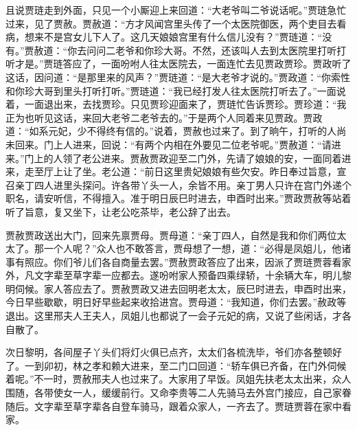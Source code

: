 \begin{parag}
    且说贾琏走到外面，只见一个小厮迎上来回道：“大老爷叫二爷说话呢。”贾琏急忙过来，见了贾赦。贾赦道：“方才风闻宫里头传了一个太医院御医，两个吏目去看病，想来不是宫女儿下人了。这几天娘娘宫里有什么信儿没有？”贾琏道：“没有。”贾赦道：“你去问问二老爷和你珍大哥。不然，还该叫人去到太医院里打听打听才是。”贾琏答应了，一面吩咐人往太医院去，一面连忙去见贾政贾珍。贾政听了这话，因问道：“是那里来的风声？”贾琏道：“是大老爷才说的。”贾政道：“你索性和你珍大哥到里头打听打听。”贾琏道：“我已经打发人往太医院打听去了。”一面说着，一面退出来，去找贾珍。只见贾珍迎面来了，贾琏忙告诉贾珍。贾珍道：“我正为也听见这话，来回大老爷二老爷去的。”于是两个人同着来见贾政。贾政道：“如系元妃，少不得终有信的。”说着，贾赦也过来了。到了晌午，打听的人尚未回来。门上人进来，回说：“有两个内相在外要见二位老爷呢。”贾赦道：“请进来。”门上的人领了老公进来。贾赦贾政迎至二门外，先请了娘娘的安，一面同着进来，走至厅上让了坐。老公道：“前日这里贵妃娘娘有些欠安。昨日奉过旨意，宣召亲丁四人进里头探问。许各带丫头一人，余皆不用。亲丁男人只许在宫门外递个职名，请安听信，不得擅入。准于明日辰巳时进去，申酉时出来。”贾政贾赦等站着听了旨意，复又坐下，让老公吃茶毕，老公辞了出去。
\end{parag}


\begin{parag}
    贾赦贾政送出大门，回来先禀贾母。贾母道：“亲丁四人，自然是我和你们两位太太了。那一个人呢？”众人也不敢答言，贾母想了一想，道：“必得是凤姐儿，他诸事有照应。你们爷儿们各自商量去罢。”贾赦贾政答应了出来，因派了贾琏贾蓉看家外，凡文字辈至草字辈一应都去。遂吩咐家人预备四乘绿轿，十余辆大车，明儿黎明伺候。家人答应去了。贾赦贾政又进去回明老太太，辰巳时进去，申酉时出来，今日早些歇歇，明日好早些起来收拾进宫。贾母道：“我知道，你们去罢。”赦政等退出。这里邢夫人王夫人，凤姐儿也都说了一会子元妃的病，又说了些闲话，才各自散了。
\end{parag}


\begin{parag}
    次日黎明，各间屋子丫头们将灯火俱已点齐，太太们各梳洗毕，爷们亦各整顿好了。一到卯初，林之孝和赖大进来，至二门口回道：“轿车俱已齐备，在门外伺候着呢。”不一时，贾赦邢夫人也过来了。大家用了早饭。凤姐先扶老太太出来，众人围随，各带使女一人，缓缓前行。又命李贵等二人先骑马去外宫门接应，自己家眷随后。文字辈至草字辈各自登车骑马，跟着众家人，一齐去了。贾琏贾蓉在家中看家。
\end{parag}


